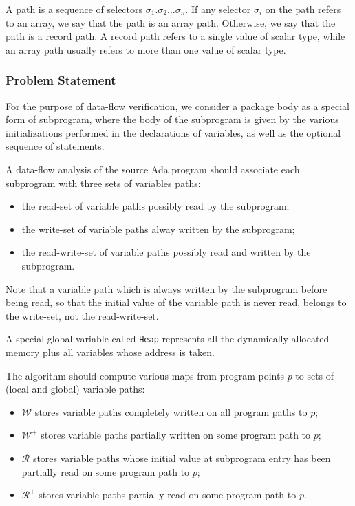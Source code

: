 \documentclass{article}
\newcommand{\code}[1]{\texttt{#1}}
\newcommand{\heap}{\code{Heap}\xspace}
\newcommand{\allwrites}{$\mathcal{W^+}$\xspace}
\newcommand{\writes}{$\mathcal{W}$\xspace}
\newcommand{\allreads}{$\mathcal{R^+}$\xspace}
\newcommand{\reads}{$\mathcal{R}$\xspace}
\newcommand{\sel}{\ensuremath{\sigma}\xspace}
\begin{document}
A path is a sequence of selectors $\sel_1.\sel_2...\sel_n$.  If any selector
$\sel_i$ on the path refers to an array, we say that the path is an array
path. Otherwise, we say that the path is a record path. A record path refers to
a single value of scalar type, while an array path usually refers to more than
one value of scalar type.
 
\subsubsection{Problem Statement}

For the purpose of data-flow verification, we consider a package body as a
special form of subprogram, where the body of the subprogram is given by the
various initializations performed in the declarations of variables, as well as
the optional sequence of statements.

A data-flow analysis of the source Ada program should associate each subprogram
with three sets of variables paths:
\begin{itemize}
\item the read-set of variable paths possibly read by the subprogram;
\item the write-set of variable paths alway written by the subprogram;
\item the read-write-set of variable paths possibly read and written by
  the subprogram.
\end{itemize}

Note that a variable path which is always written by the subprogram before
being read, so that the initial value of the variable path is never read,
belongs to the write-set, not the read-write-set.

A special global variable called \heap represents all the dynamically allocated
memory plus all variables whose address is taken.

The algorithm should compute various maps from program points $p$ to sets of
(local and global) variable paths:
\begin{itemize}
\item \writes stores variable paths completely written on all program paths
  to $p$;
\item \allwrites stores variable paths partially written on some program
  path to $p$;
\item \reads stores variable paths whose initial value at subprogram entry has
  been partially read on some program path to $p$;
\item \allreads stores variable paths partially read on some program path to
  $p$.
\end{itemize}
\end{document}
